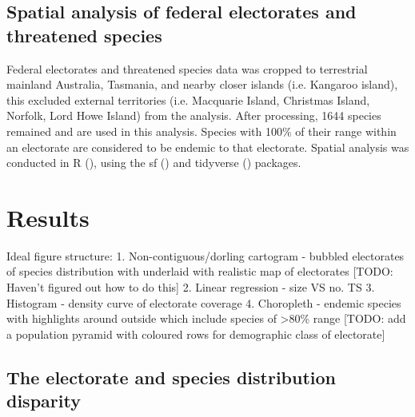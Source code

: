 \documentclass[a4paper,11pt]{article}
\begin{document}
\subsection{Spatial analysis of federal electorates and threatened species}

Federal electorates and threatened species data was cropped to terrestrial mainland Australia, Tasmania, and nearby closer islands (i.e. Kangaroo island), this excluded external territories (i.e. Macquarie Island, Christmas Island, Norfolk, Lord Howe Island) from the analysis. After processing, 1644 species remained and are used in this analysis. Species with 100\% of their range within an electorate are considered to be endemic to that electorate. Spatial analysis was conducted in R (\cite{rcoreteamLanguageEnvironmentStatistical2021}), using the sf (\cite{pebesmaSimpleFeaturesStandardized2018}) and tidyverse (\cite{wickhamWelcomeTidyverse2019}) packages.


\section{Results}

Ideal figure structure:
1. Non-contiguous/dorling cartogram - bubbled electorates of species distribution with underlaid with realistic map of electorates [TODO: Haven't figured out how to do this]
2. Linear regression - size VS no. TS
3. Histogram - density curve of electorate coverage
4. Choropleth - endemic species with highlights around outside which include species of >80\% range [TODO: add a population pyramid with coloured rows for demographic class of electorate]

\subsection{The electorate and species distribution disparity}
\end{document}
